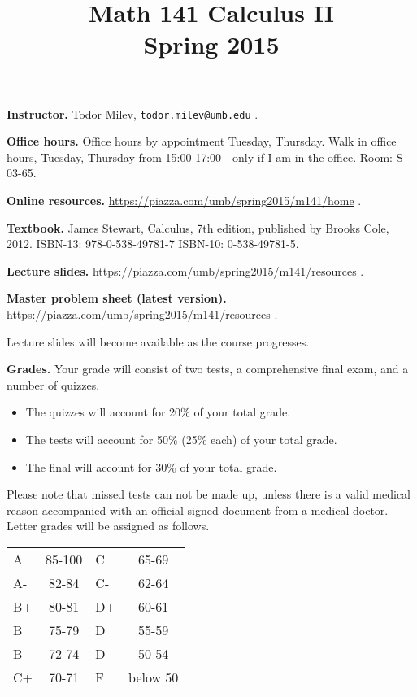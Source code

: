 \documentclass{article}
\title{Math 141 Calculus II \\ Spring 2015}
\date{}
\begin{document}
\maketitle

\noindent \textbf{Instructor.} Todor Milev, \href{mailto:todor.milev@umb.edu}{\nolinkurl{todor.milev@umb.edu}} \quad \quad \quad .

\medskip
\noindent \textbf{Office hours. } Office hours by appointment Tuesday, Thursday. Walk in office hours, Tuesday, Thursday from 15:00-17:00 - only if I am in the office. Room: S-03-65.

\medskip
\noindent \textbf{Online resources. }  \url{https://piazza.com/umb/spring2015/m141/home}  \quad \quad \quad .


\medskip\noindent \textbf{Textbook. }  James Stewart, Calculus, 7th edition, published by Brooks Cole, 2012. ISBN-13: 978-0-538-49781-7
ISBN-10: 0-538-49781-5.

\medskip \noindent \textbf{Lecture slides. }  \url{https://piazza.com/umb/spring2015/m141/resources} \quad \quad \quad .

\medskip \noindent \textbf{Master problem sheet (latest version). }  \url{https://piazza.com/umb/spring2015/m141/resources} \quad \quad \quad .


\medskip\noindent Lecture slides will become available as the course progresses.



\medskip
\noindent \textbf{Grades.} Your grade will consist of two tests, a comprehensive final exam, and a number of quizzes. 
\begin{itemize}
\item The quizzes will account for 20\% of your total grade.
\item The tests will account for 50\% (25\% each) of your total grade.
\item The final will account for 30\% of your total grade.
\end{itemize}
Please note that missed tests can not be made up, unless there is a valid medical reason accompanied with an official signed document from a medical doctor. Letter grades will be assigned as follows. 

\begin{center}
\begin{tabular}{lc|lc}
A & 85-100 & C & 65-69 \\
A-& 82-84 & C- & 62-64 \\
B+& 80-81 & D+ & 60-61 \\
B & 75-79& D & 55-59\\
B-& 72-74& D- & 50-54\\
C+& 70-71& F & below 50\\
\end{tabular}

\end{center}
\end{document}
